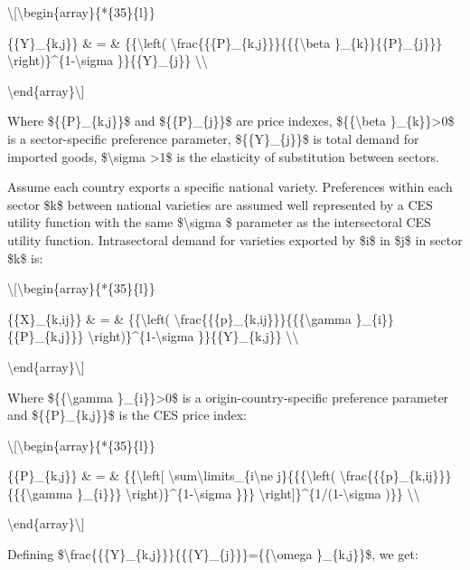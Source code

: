 \documentclass[12pt,twoside,a4paper,notitlepage]{article}
\begin{document}
\textbackslash [\textbackslash begin\{array\}\{*\{35\}\{l\}\}

 \{\{Y\}\_\{k,j\}\} \& = \& \{\{\textbackslash left( \textbackslash frac\{\{\{P\}\_\{k,j\}\}\}\{\{\{\textbackslash beta \}\_\{k\}\}\{\{P\}\_\{j\}\}\} \textbackslash right)\}\textasciicircum{}\{1-\textbackslash sigma \}\}\{\{Y\}\_\{j\}\} \textbackslash \textbackslash 

\textbackslash end\{array\}\textbackslash ]

Where \$\{\{P\}\_\{k,j\}\}\$ and \$\{\{P\}\_\{j\}\}\$ are price indexes, \$\{\{\textbackslash beta \}\_\{k\}\}{\textgreater}0\$ is a sector-specific preference parameter, \$\{\{Y\}\_\{j\}\}\$ is total demand for imported goods, \$\textbackslash sigma {\textgreater}1\$ is the elasticity of substitution between sectors. 

 Assume each country exports a specific national variety. Preferences within each sector \$k\$ between national varieties are assumed well represented by a CES utility function with the same \$\textbackslash sigma \$ parameter as the intersectoral CES utility function. Intrasectoral demand for varieties exported by \$i\$ in \$j\$ in sector \$k\$ is: 

\textbackslash [\textbackslash begin\{array\}\{*\{35\}\{l\}\}

 \{\{X\}\_\{k,ij\}\} \& = \& \{\{\textbackslash left( \textbackslash frac\{\{\{p\}\_\{k,ij\}\}\}\{\{\{\textbackslash gamma \}\_\{i\}\}\{\{P\}\_\{k,j\}\}\} \textbackslash right)\}\textasciicircum{}\{1-\textbackslash sigma \}\}\{\{Y\}\_\{k,j\}\} \textbackslash \textbackslash 

\textbackslash end\{array\}\textbackslash ]

Where \$\{\{\textbackslash gamma \}\_\{i\}\}{\textgreater}0\$ is a origin-country-specific preference parameter and \$\{\{P\}\_\{k,j\}\}\$ is the CES price index:

\textbackslash [\textbackslash begin\{array\}\{*\{35\}\{l\}\}

 \{\{P\}\_\{k,j\}\} \& = \& \{\{\textbackslash left[ \textbackslash sum\textbackslash limits\_\{i\textbackslash ne j\}\{\{\{\textbackslash left( \textbackslash frac\{\{\{p\}\_\{k,ij\}\}\}\{\{\{\textbackslash gamma \}\_\{i\}\}\} \textbackslash right)\}\textasciicircum{}\{1-\textbackslash sigma \}\}\} \textbackslash right]\}\textasciicircum{}\{1/(1-\textbackslash sigma )\}\} \textbackslash \textbackslash 

\textbackslash end\{array\}\textbackslash ]

 Defining \$\textbackslash frac\{\{\{Y\}\_\{k,j\}\}\}\{\{\{Y\}\_\{j\}\}\}=\{\{\textbackslash omega \}\_\{k,j\}\}\$, we get: 
\end{document}
